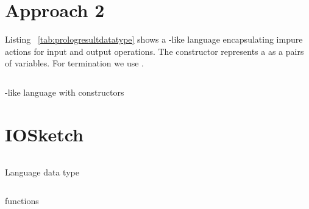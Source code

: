 \documentclass[thesis-solanki.tex]{subfiles}
\begin{document}
\section{Approach 2}

\begin{comment}
So when the program is getting interpreted the interpreter encounters an IO operation which then gets "interpreted" to the above and it 
continues normally.

The interpreted program is still pure since the IO actions have not been executed 

if the running is done inside a monad then the IO still is pure.
\end{comment}


Listing ~\ref{tab:prologresultdatatype} shows a -like language encapsulating impure actions for input and output 
operations. The  constructor represents a  as a pairs of variables. For termination 
we use . 


\begin{code-list}[H]
\begin{singlespace}

  \inputminted[linenos, firstline=7, lastline=16]{haskell}{haskell-proto4-platen-winkel.hs}
\end{singlespace}
\caption{-like language with  constructors}
\label{tab:prologresultdatatype}
\end{code-list}

\section{IOSketch}

\begin{code-list}[H]
\begin{singlespace}
\inputminted[linenos, firstline=69, lastline=93]{haskell}{IOSketch.hs}
\end{singlespace}
\caption{Language data type}
\label{tab:iosketchlanguagedatatype}
\end{code-list}


\begin{code-list}[H]
\begin{singlespace}
\inputminted[linenos, firstline=98, lastline=133]{haskell}{IOSketch.hs}
\end{singlespace}
\caption{ functions}
\label{tab:iosketchrunfunctions}
\end{code-list}
\end{document}
